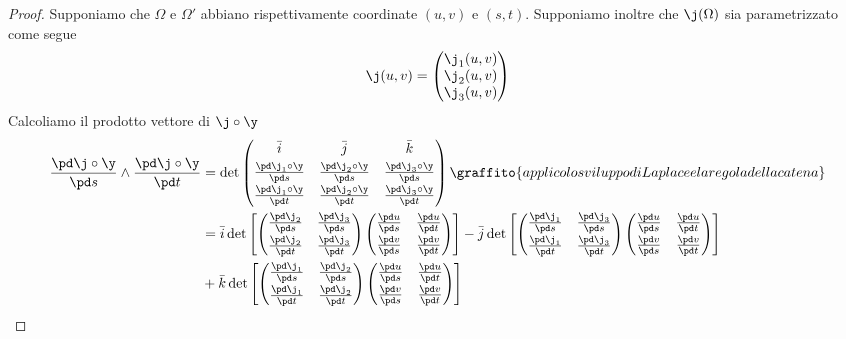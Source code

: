 \begin{proof}
	Supponiamo che \(\Omega\) e \(\Omega'\) abbiano rispettivamente coordinate \((u,v)\) e \((s,t)\).
	Supponiamo inoltre che \(\j(\Omega)\) sia parametrizzato come segue
	\[
		\j(u,v) = 	\begin{pmatrix}
			\j_1(u,v) \\
			\j_2(u,v) \\
			\j_3(u,v)
		\end{pmatrix}
	\]
	Calcoliamo il prodotto vettore di \(\j\circ \y\)
	\[
		\begin{split}
			\frac{\pd\j \circ \y}{\pd s} \wedge \frac{\pd\j \circ \y}{\pd t} & = \det 	\begin{pmatrix}
				\bar{i}                        & \bar{j}                        & \bar{k}                        \\[0.3em]
				\frac{\pd\j_1 \circ \y}{\pd s} & \frac{\pd\j_2 \circ \y}{\pd s} & \frac{\pd\j_3 \circ \y}{\pd s} \\[0.3em]
				\frac{\pd\j_1 \circ \y}{\pd t} & \frac{\pd\j_2 \circ \y}{\pd t} & \frac{\pd\j_3 \circ \y}{\pd t}
			\end{pmatrix}\graffito{applico lo sviluppo di Laplace e la regola della catena}\\
			& = \bar{i} \det \left[ \begin{pmatrix}\frac{\pd \j_2}{\pd s} & \frac{\pd \j_3}{\pd s}\\[0.3em]\frac{\pd \j_2}{\pd t} & \frac{\pd \j_3}{\pd t}\end{pmatrix} \begin{pmatrix}\frac{\pd u}{\pd s} & \frac{\pd u}{\pd t}\\[0.3em]\frac{\pd v}{\pd s} & \frac{\pd v}{\pd t}\end{pmatrix} \right] - \bar{j} \det \left[ \begin{pmatrix}\frac{\pd \j_1}{\pd s} & \frac{\pd \j_3}{\pd s}\\[0.3em]\frac{\pd \j_1}{\pd t} & \frac{\pd \j_3}{\pd t}\end{pmatrix} \begin{pmatrix}\frac{\pd u}{\pd s} & \frac{\pd u}{\pd t}\\[0.3em]\frac{\pd v}{\pd s} & \frac{\pd v}{\pd t}\end{pmatrix} \right]\\
			& + \bar{k} \det \left[ \begin{pmatrix}\frac{\pd \j_1}{\pd s} & \frac{\pd \j_2}{\pd s}\\[0.3em]\frac{\pd \j_1}{\pd t} & \frac{\pd \j_2}{\pd t}\end{pmatrix} \begin{pmatrix}\frac{\pd u}{\pd s} & \frac{\pd u}{\pd t}\\[0.3em]\frac{\pd v}{\pd s} & \frac{\pd v}{\pd t}\end{pmatrix} \right]\\

\end{split}\]
\end{proof}
